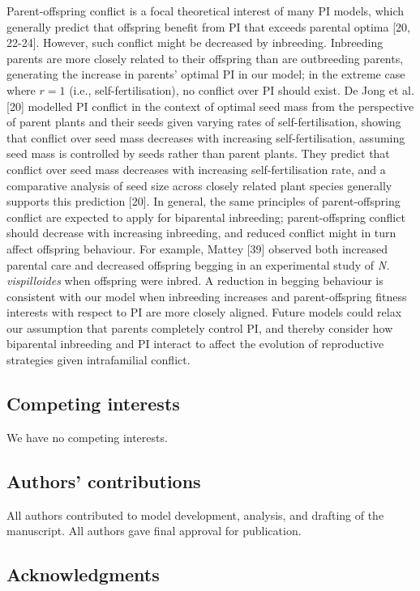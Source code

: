 \documentclass[12pt]{article}
\begin{document}
Parent-offspring conflict is a focal theoretical interest of many PI models, which generally predict that offspring benefit from PI that exceeds parental optima [20, 22-24]. However, such conflict might be decreased by inbreeding. Inbreeding parents are more closely related to their offspring than are outbreeding parents, generating the increase in parents' optimal PI in our model; in the extreme case where $r=1$ (i.e., self-fertilisation), no conflict over PI should exist. De Jong et al. [20] modelled PI conflict in the context of optimal seed mass from the perspective of parent plants and their seeds given varying rates of self-fertilisation, showing that conflict over seed mass decreases with increasing self-fertilisation, assuming seed mass is controlled by seeds rather than parent plants. They predict that conflict over seed mass decreases with increasing self-fertilisation rate, and a comparative analysis of seed size across closely related plant species generally supports this prediction [20]. In general, the same principles of parent-offspring conflict are expected to apply for biparental inbreeding; parent-offspring conflict should decrease with increasing inbreeding, and reduced conflict might in turn affect offspring behaviour. For example, Mattey [39] observed both increased parental care and decreased offspring begging in an experimental study of \textit{N. vispilloides} when offspring were inbred. A reduction in begging behaviour is consistent with our model when inbreeding increases and parent-offspring fitness interests with respect to PI are more closely aligned. Future models could relax our assumption that parents completely control PI, and thereby consider how biparental inbreeding and PI interact to affect the evolution of reproductive strategies given intrafamilial conflict.

\subsection*{Competing interests}

We have no competing interests.

\subsection*{Authors' contributions}

All authors contributed to model development, analysis, and drafting of the manuscript. All authors gave final approval for publication. 

\subsection*{Acknowledgments}
\end{document}
